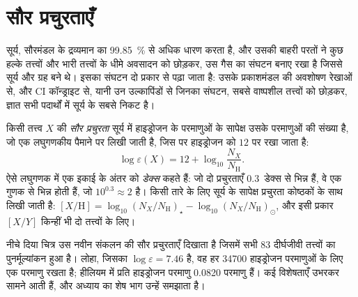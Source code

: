 \section{सौर प्रचुरताएँ}\label{sec:b3:origin-of-elements:solar}

सूर्य, सौरमंडल के द्रव्यमान का \qty{99.85}{\percent} से अधिक धारण करता है,
और उसकी बाहरी परतों ने कुछ हल्के तत्त्वों और भारी तत्त्वों के धीमे अवसादन को छोड़कर,
उस गैस का संघटन बनाए रखा है जिससे
सूर्य और ग्रह बने थे। इसका संघटन दो प्रकार से पढ़ा जाता है:
उसके प्रकाशमंडल की अवशोषण रेखाओं से, और CI कॉन्ड्राइट से, यानी
उन उल्कापिंडों से जिनका संघटन, सबसे वाष्पशील
तत्त्वों को छोड़कर, ज्ञात सभी पदार्थों में सूर्य के सबसे निकट है।

\begin{definition}[सौर प्रचुरता; डेक्स]\label{def:b3:origin-of-elements:abundance}
किसी तत्त्व $X$ की \emph{सौर प्रचुरता} सूर्य में
हाइड्रोजन के परमाणुओं के सापेक्ष उसके परमाणुओं की संख्या है, जो
एक लघुगणकीय पैमाने पर लिखी जाती है, जिस पर हाइड्रोजन को $12$ पर रखा जाता है:
\[
\log\varepsilon(X) = 12 + \log_{10}\frac{N_X}{N_\mathrm{H}} .
\]
ऐसे लघुगणक में एक इकाई के अंतर को
\emph{डेक्स} कहते हैं: जो दो प्रचुरताएँ $0.3$~डेक्स से भिन्न हैं, वे
एक गुणक से भिन्न होती हैं, जो $10^{0.3} \approx 2$ है। किसी तारे के लिए सूर्य के सापेक्ष
प्रचुरता कोष्ठकों के साथ लिखी जाती है:
$[X/\mathrm{H}] = \log_{10}(N_X/N_\mathrm{H})_\star -
\log_{10}(N_X/N_\mathrm{H})_\odot$, और इसी प्रकार $[X/Y]$ किन्हीं भी दो
तत्त्वों के लिए।
\end{definition}

नीचे दिया चित्र उस नवीन संकलन की सौर प्रचुरताएँ दिखाता है
जिसमें सभी 83 दीर्घजीवी तत्त्वों का पुनर्मूल्यांकन हुआ है। लोहा, जिसका
$\log\varepsilon = 7.46$ है, वह हर \num{34700} हाइड्रोजन परमाणुओं के लिए एक परमाणु रखता है;
हीलियम में प्रति हाइड्रोजन परमाणु \num{0.0820} परमाणु हैं। कई
विशेषताएँ उभरकर सामने आती हैं, और अध्याय का शेष भाग उन्हें समझाता है।

